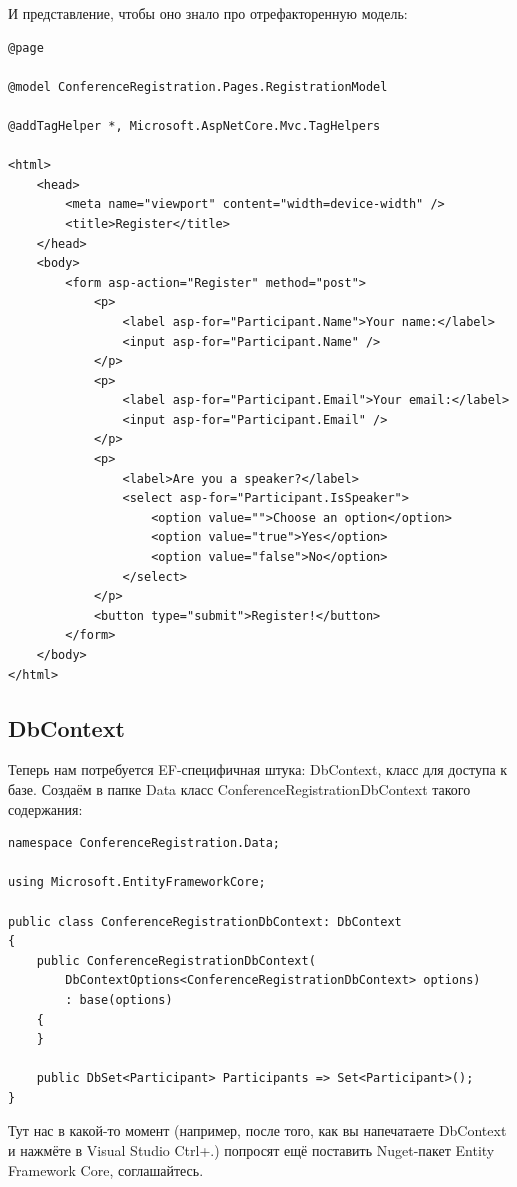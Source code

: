 \documentclass[a5paper]{article}
\begin{document}
И представление, чтобы оно знало про отрефакторенную модель:

\begin{verbatim}
@page

@model ConferenceRegistration.Pages.RegistrationModel

@addTagHelper *, Microsoft.AspNetCore.Mvc.TagHelpers

<html>
    <head>
        <meta name="viewport" content="width=device-width" />
        <title>Register</title>
    </head>
    <body>
        <form asp-action="Register" method="post">
            <p>
                <label asp-for="Participant.Name">Your name:</label>
                <input asp-for="Participant.Name" />
            </p>
            <p>
                <label asp-for="Participant.Email">Your email:</label>
                <input asp-for="Participant.Email" />
            </p>
            <p>
                <label>Are you a speaker?</label>
                <select asp-for="Participant.IsSpeaker">
                    <option value="">Choose an option</option>
                    <option value="true">Yes</option>
                    <option value="false">No</option>
                </select>
            </p>
            <button type="submit">Register!</button>
        </form>
    </body>
</html>
\end{verbatim}

\subsection{DbContext}

Теперь нам потребуется EF-специфичная штука: DbContext, класс для доступа к базе. Создаём в папке Data класс ConferenceRegistrationDbContext такого содержания:

\begin{verbatim}
namespace ConferenceRegistration.Data;

using Microsoft.EntityFrameworkCore;

public class ConferenceRegistrationDbContext: DbContext
{
    public ConferenceRegistrationDbContext(
        DbContextOptions<ConferenceRegistrationDbContext> options)
        : base(options)
    {
    }

    public DbSet<Participant> Participants => Set<Participant>();
}
\end{verbatim}

Тут нас в какой-то момент (например, после того, как вы напечатаете DbContext и нажмёте в Visual Studio Ctrl+.) попросят ещё поставить Nuget-пакет Entity Framework Core, соглашайтесь.
\end{document}
